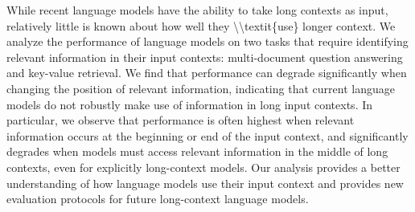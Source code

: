 While recent language models have the ability to take long contexts as input, relatively little is known about how well they \textbackslash{}\textbackslash{}textit\{use\} longer context. We analyze the performance of language models on two tasks that require identifying relevant information in their input contexts: multi-document question answering and key-value retrieval. We find that performance can degrade significantly when changing the position of relevant information, indicating that current language models do not robustly make use of information in long input contexts. In particular, we observe that performance is often highest when relevant information occurs at the beginning or end of the input context, and significantly degrades when models must access relevant information in the middle of long contexts, even for explicitly long-context models. Our analysis provides a better understanding of how language models use their input context and provides new evaluation protocols for future long-context language models.